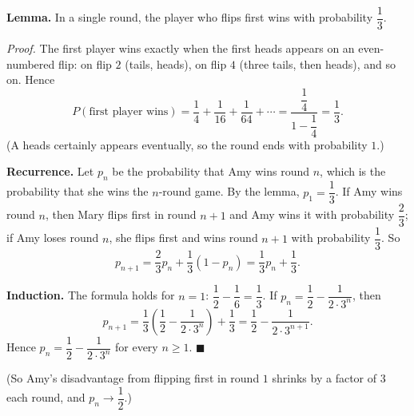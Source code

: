 \textbf{Lemma.} In a single round, the player who flips first wins with probability $\dfrac13$.

\emph{Proof.} The first player wins exactly when the first heads appears on an even-numbered flip: on flip $2$ (tails, heads), on flip $4$ (three tails, then heads), and so on. Hence
\[P(\text{first player wins})=\dfrac14+\dfrac1{16}+\dfrac1{64}+\cdots=\dfrac{\dfrac14}{1-\dfrac14}=\dfrac13.\]
(A heads certainly appears eventually, so the round ends with probability $1$.)

\textbf{Recurrence.} Let $p_n$ be the probability that Amy wins round $n$, which is the probability that she wins the $n$-round game. By the lemma, $p_1=\dfrac13$. If Amy wins round $n$, then Mary flips first in round $n+1$ and Amy wins it with probability $\dfrac23$; if Amy loses round $n$, she flips first and wins round $n+1$ with probability $\dfrac13$. So
\[p_{n+1}=\dfrac23p_n+\dfrac13(1-p_n)=\dfrac13p_n+\dfrac13.\]

\textbf{Induction.} The formula holds for $n=1$: $\dfrac12-\dfrac16=\dfrac13$. If $p_n=\dfrac12-\dfrac{1}{2\cdot3^n}$, then
\[p_{n+1}=\dfrac13\left(\dfrac12-\dfrac1{2\cdot3^n}\right)+\dfrac13=\dfrac12-\dfrac1{2\cdot3^{n+1}}.\]
Hence $p_n=\dfrac12-\dfrac{1}{2\cdot3^n}$ for every $n\ge1$. $\blacksquare$

(So Amy's disadvantage from flipping first in round $1$ shrinks by a factor of $3$ each round, and $p_n\to\dfrac12$.)
